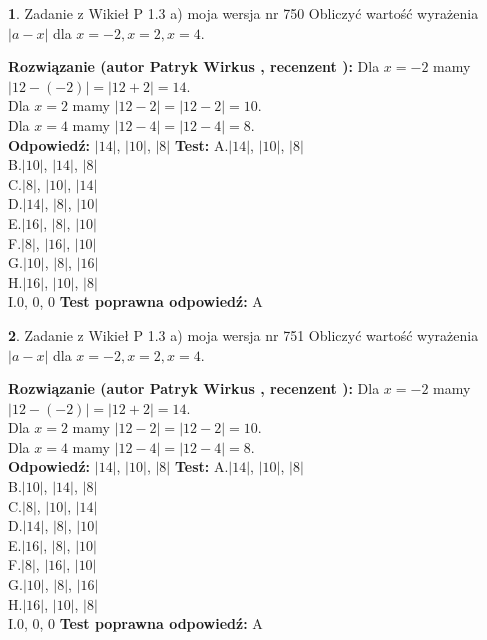 \documentclass[12pt, a4paper]{article}
\theoremstyle{definition} %
\newtheorem{zad}{}
\newcommand{\zadStart}[1]{\begin{zad}#1\newline}
\newcommand{\zadStop}{\end{zad}}
\newcommand{\rozwStart}[2]{\noindent \textbf{Rozwiązanie (autor #1 , recenzent #2): }\newline}
\newcommand{\rozwStop}{\newline}
\newcommand{\odpStart}{\noindent \textbf{Odpowiedź:}\newline}
\newcommand{\odpStop}{\newline}
\newcommand{\testStart}{\noindent \textbf{Test:}\newline}
\newcommand{\testStop}{\newline}
\newcommand{\kluczStart}{\noindent \textbf{Test poprawna odpowiedź:}\newline}
\newcommand{\kluczStop}{\newline}
\begin{document}
\zadStart{Zadanie z Wikieł P 1.3 a) moja wersja nr 750}
Obliczyć wartość wyrażenia $|a - x|$ dla $x=-2,x=2,x=4$.
\zadStop
\rozwStart{Patryk Wirkus}{}
Dla $x = -2$ mamy $|12 - (-2)| = |12 + 2| = 14$.\\
Dla $x = 2$ mamy $|12 - 2| = |12 - 2| = 10$.\\
Dla $x = 4$ mamy $|12 - 4| = |12 - 4| = 8$.\\
\rozwStop
\odpStart
$|14|$, $|10|$, $|8|$
\odpStop
\testStart
A.$|14|$, $|10|$, $|8|$\\
B.$|10|$, $|14|$, $|8|$\\
C.$|8|$, $|10|$, $|14|$\\
D.$|14|$, $|8|$, $|10|$\\
E.$|16|$, $|8|$, $|10|$\\
F.$|8|$, $|16|$, $|10|$\\
G.$|10|$, $|8|$, $|16|$\\
H.$|16|$, $|10|$, $|8|$\\
I.$0$, $0$, $0$
\testStop
\kluczStart
A
\kluczStop



\zadStart{Zadanie z Wikieł P 1.3 a) moja wersja nr 751}
Obliczyć wartość wyrażenia $|a - x|$ dla $x=-2,x=2,x=4$.
\zadStop
\rozwStart{Patryk Wirkus}{}
Dla $x = -2$ mamy $|12 - (-2)| = |12 + 2| = 14$.\\
Dla $x = 2$ mamy $|12 - 2| = |12 - 2| = 10$.\\
Dla $x = 4$ mamy $|12 - 4| = |12 - 4| = 8$.\\
\rozwStop
\odpStart
$|14|$, $|10|$, $|8|$
\odpStop
\testStart
A.$|14|$, $|10|$, $|8|$\\
B.$|10|$, $|14|$, $|8|$\\
C.$|8|$, $|10|$, $|14|$\\
D.$|14|$, $|8|$, $|10|$\\
E.$|16|$, $|8|$, $|10|$\\
F.$|8|$, $|16|$, $|10|$\\
G.$|10|$, $|8|$, $|16|$\\
H.$|16|$, $|10|$, $|8|$\\
I.$0$, $0$, $0$
\testStop
\kluczStart
A
\kluczStop
\end{document}
